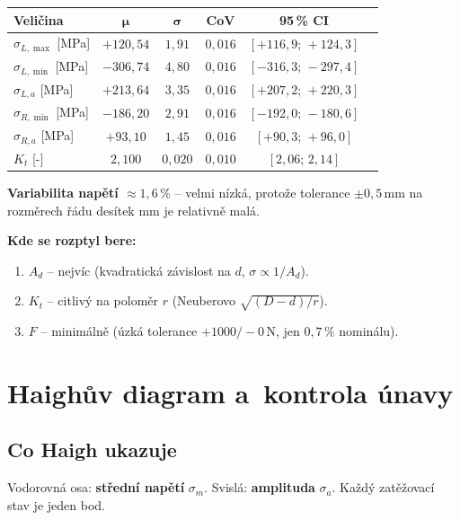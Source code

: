 \documentclass[a4paper,11pt]{article}
\newcommand{\unit}[1]{\,\mathrm{#1}}
\begin{document}
\begin{table}[H]
\centering
\small
\begin{tabular}{lccccc}
\toprule
\textbf{Veličina} & $\boldsymbol{\mu}$ & $\boldsymbol{\sigma}$ & \textbf{CoV} & \textbf{95\,\% CI} \\
\midrule
$\sigma_{L,\max}$ [MPa] & $+120{,}54$ & $1{,}91$ & $0{,}016$ & $[+116{,}9;\,+124{,}3]$ \\
$\sigma_{L,\min}$ [MPa] & $-306{,}74$ & $4{,}80$ & $0{,}016$ & $[-316{,}3;\,-297{,}4]$ \\
$\sigma_{L,a}$    [MPa] & $+213{,}64$ & $3{,}35$ & $0{,}016$ & $[+207{,}2;\,+220{,}3]$ \\
$\sigma_{R,\min}$ [MPa] & $-186{,}20$ & $2{,}91$ & $0{,}016$ & $[-192{,}0;\,-180{,}6]$ \\
$\sigma_{R,a}$    [MPa] & $+93{,}10$  & $1{,}45$ & $0{,}016$ & $[+90{,}3;\,+96{,}0]$ \\
$K_t$ [-]               & $2{,}100$   & $0{,}020$ & $0{,}010$ & $[2{,}06;\,2{,}14]$ \\
\bottomrule
\end{tabular}
\end{table}

\textbf{Variabilita napětí $\approx 1{,}6\,\%$} -- velmi nízká, protože tolerance $\pm 0{,}5\unit{mm}$ na rozměrech řádu desítek mm je relativně malá.

\textbf{Kde se rozptyl bere:}
\begin{enumerate}[nosep]
    \item $A_d$ -- nejvíc (kvadratická závislost na $d$, $\sigma \propto 1/A_d$).
    \item $K_t$ -- citlivý na poloměr $r$ (Neuberovo $\sqrt{(D-d)/r}$).
    \item $F$ -- minimálně (úzká tolerance $+1000/-0\unit{N}$, jen $0{,}7\,\%$ nominálu).
\end{enumerate}

\section{Haighův diagram a~kontrola únavy}

\subsection{Co Haigh ukazuje}

Vodorovná osa: \textbf{střední napětí} $\sigma_m$. Svislá: \textbf{amplituda} $\sigma_a$. Každý zatěžovací stav je jeden bod.
\end{document}
